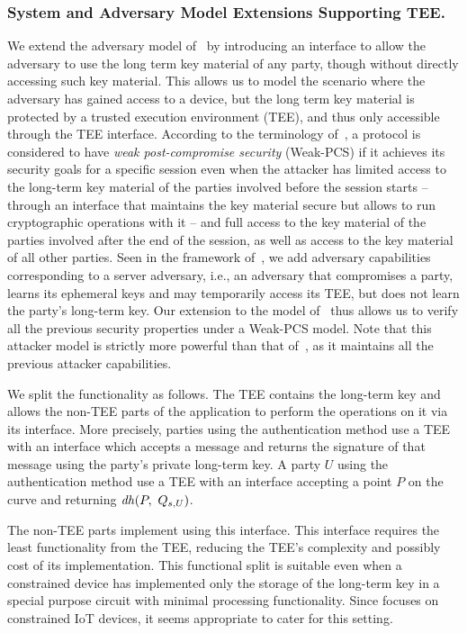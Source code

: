 \subsubsection{System and Adversary Model Extensions Supporting TEE.}
\label{sec:TEE:advModel}
%
We extend the adversary model of~\cite{Norr21} by introducing an interface to
allow the adversary to use the long term key material of any party, though
without directly accessing such key material.
%
This allows us to model the scenario where the adversary has gained access to
a device, but the long term key material is protected by a trusted execution
environment (TEE), and thus only accessible through the TEE interface.
%
According to the terminology of~\cite{DBLP:conf/csfw/Cohn-GordonCG16}, a
protocol is considered to have \emph{weak post-compromise security}
(Weak-PCS) if it achieves its security goals for a specific session
even when the attacker has limited access to the long-term key material
of the parties involved before the session starts -- through an interface 
that maintains the key material secure but allows to run cryptographic 
operations with it -- and full access to the key material of the parties
involved after the end of the session, as well as access to the key material
of all other parties.
%
Seen in the framework of~\cite{DBLP:conf/icics/XuZRWTZ20}, we add adversary
capabilities corresponding to a server adversary, i.e., an adversary that
compromises a party, learns its ephemeral keys and may temporarily access its
TEE, but does not learn the party's long-term key.
%
Our extension to the model of~\cite{Norr21} thus allows us to verify all the
previous security properties under a Weak-PCS model.
%
Note that this attacker model is strictly more powerful than that of~\cite{Norr21},
as it maintains all the previous attacker capabilities.
%

We split the \mEdhoc{} functionality as follows.
%
The TEE contains the long-term key and allows the non-TEE parts of the
application to perform the operations on it via its interface.
%
More precisely, parties using the \mSig{} authentication method use a TEE 
with an interface which accepts a message and returns the signature of that 
message using the party's private long-term key.
%
A party $U$ using the \mStat{} authentication method use a TEE with an 
interface accepting a point $P$ on the curve and returning $\mDH(P,\ \mGu{})$.
%

The non-TEE parts implement \mEdhoc{} using this interface.
%
This interface requires the least functionality from the TEE, reducing the 
TEE's complexity and possibly cost of its implementation.
%
This functional split is suitable even when a constrained device has
implemented only the storage of the long-term key in 
a special purpose circuit with minimal processing functionality.
%
Since \mEdhoc{} focuses on constrained IoT devices, it seems appropriate to
cater for this setting.
%


